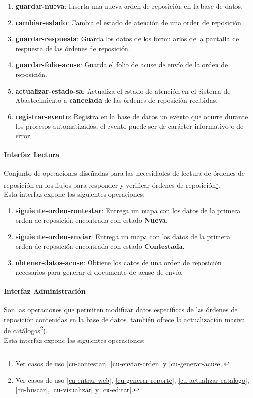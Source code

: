 \begin{enumerate}
	\item \textbf{guardar-nueva}: Inserta una nueva orden de reposición en la base de datos.
	\item \textbf{cambiar-estado}: Cambia el estado de atención de una orden de reposición.
	\item \textbf{guardar-respuesta}: Guarda los datos de los formularios de la pantalla de respuesta de las órdenes de reposición.
	\item \textbf{guardar-folio-acuse}: Guarda el folio de acuse de envío de la orden de reposición.
	\item \textbf{actualizar-estado-sa}: Actualiza el estado de atención en el Sistema de Abastecimiento a \textbf{cancelada} de las órdenes de reposición recibidas.
	\item \textbf{registrar-evento}: Registra en la base de datos un evento que ocurre durante los procesos automatizados, el evento puede ser de carácter informativo o de error.
\end{enumerate}

\paragraph{Interfaz Lectura\\}
Conjunto de operaciones diseñadas para las necesidades de lectura de órdenes de reposición en los flujos para responder y verificar órdenes de reposición\footnote{Ver casos de uso \ref{cu-contestar}, \ref{cu-enviar-orden} y \ref{cu-generar-acuse}.}.\\
Esta interfaz expone las siguientes operaciones:

\begin{enumerate}
	\item \textbf{siguiente-orden-contestar}: Entrega un mapa con los datos de la primera orden de reposición encontrada con estado \textbf{Nueva}.
	\item \textbf{siguiente-orden-enviar}: Entrega un mapa con los datos de la primera orden de reposición encontrada con estado \textbf{Contestada}.
	\item \textbf{obtener-datos-acuse}: Obtiene los datos de una orden de reposición necesarios para generar el documento de acuse de envío.
\end{enumerate}

\paragraph{Interfaz Administración\\}
Son las operaciones que permiten modificar datos específicos de las órdenes de reposición contenidas en la base de datos, también ofrece la actualización masiva de catálogos\footnote{Ver casos de uso \ref{cu-entrar-web}, \ref{cu-generar-reporte}, \ref{cu-actualizar-catalogo}, \ref{cu-buscar}, \ref{cu-visualizar} y \ref{cu-editar}.}).\\
Esta interfaz expone las siguientes operaciones:

